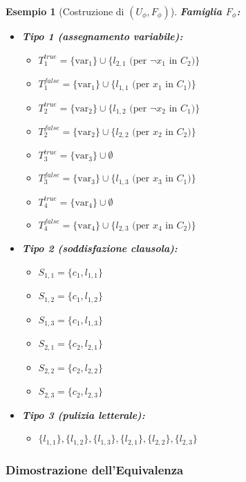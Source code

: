 \documentclass[a4paper, 11pt]{book} %
\newtheorem{example}[theorem]{Esempio}
\theoremstyle{definition}
\begin{document}
\begin{example}[Costruzione di $(U_\phi, F_\phi)$]
\textbf{Famiglia $F_\phi$:}
\begin{itemize}
    \item \textbf{Tipo 1 (assegnamento variabile):}
    \begin{itemize}
        \item $T_1^{true} = \{\text{var}_1\} \cup \{l_{2,1} \text{ (per } \neg x_1 \text{ in } C_2)\}$
        \item $T_1^{false} = \{\text{var}_1\} \cup \{l_{1,1} \text{ (per } x_1 \text{ in } C_1)\}$
        \item $T_2^{true} = \{\text{var}_2\} \cup \{l_{1,2} \text{ (per } \neg x_2 \text{ in } C_1)\}$
        \item $T_2^{false} = \{\text{var}_2\} \cup \{l_{2,2} \text{ (per } x_2 \text{ in } C_2)\}$
        \item $T_3^{true} = \{\text{var}_3\} \cup \emptyset$
        \item $T_3^{false} = \{\text{var}_3\} \cup \{l_{1,3} \text{ (per } x_3 \text{ in } C_1)\}$
        \item $T_4^{true} = \{\text{var}_4\} \cup \emptyset$
        \item $T_4^{false} = \{\text{var}_4\} \cup \{l_{2,3} \text{ (per } x_4 \text{ in } C_2)\}$
    \end{itemize}
    \item \textbf{Tipo 2 (soddisfazione clausola):}
    \begin{itemize}
        \item $S_{1,1} = \{c_1, l_{1,1}\}$
        \item $S_{1,2} = \{c_1, l_{1,2}\}$
        \item $S_{1,3} = \{c_1, l_{1,3}\}$
        \item $S_{2,1} = \{c_2, l_{2,1}\}$
        \item $S_{2,2} = \{c_2, l_{2,2}\}$
        \item $S_{2,3} = \{c_2, l_{2,3}\}$
    \end{itemize}
    \item \textbf{Tipo 3 (pulizia letterale):}
    \begin{itemize}
        \item $\{l_{1,1}\}, \{l_{1,2}\}, \{l_{1,3}\}, \{l_{2,1}\}, \{l_{2,2}\}, \{l_{2,3}\}$
    \end{itemize}
\end{itemize}
\end{example}

\subsubsection{Dimostrazione dell'Equivalenza}
\end{document}

